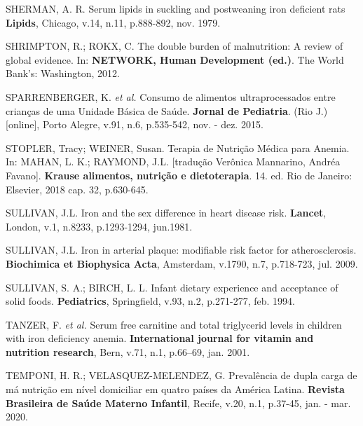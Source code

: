 \noindent SHERMAN, A. R. Serum lipids in suckling and postweaning iron deficient rats \textbf{Lipids}, Chicago, v.14, n.11, p.888-892, nov. 1979.

\bigbreak

\noindent SHRIMPTON, R.; ROKX, C. The double burden of malnutrition: A review of global evidence. In: \textbf{NETWORK, Human Development (ed.)}. The World Bank’s: Washington, 2012.

\bigbreak

\noindent SPARRENBERGER, K. \textit{et al.} Consumo de alimentos ultraprocessados entre crianças de uma Unidade Básica de Saúde. \textbf{Jornal de Pediatria}. (Rio J.) [online], Porto Alegre, v.91, n.6, p.535-542, nov. - dez. 2015.

\bigbreak

\noindent STOPLER, Tracy; WEINER, Susan. Terapia de Nutrição Médica para Anemia. In: MAHAN, L. K.; RAYMOND, J.L. [tradução Verônica Mannarino, Andréa Favano]. \textbf{Krause alimentos, nutrição e dietoterapia}. 14. ed. Rio de Janeiro: Elsevier, 2018 cap. 32, p.630-645.

\bigbreak

\noindent SULLIVAN, J.L. Iron and the sex difference in heart disease risk. \textbf{Lancet}, London, v.1, n.8233, p.1293-1294, jun.1981.

\bigbreak

\noindent SULLIVAN, J.L. Iron in arterial plaque: modifiable risk factor for atherosclerosis. \textbf{Biochimica et Biophysica Acta}, Amsterdam, v.1790, n.7, p.718-723, jul. 2009.

\bigbreak

\noindent SULLIVAN, S. A.; BIRCH, L. L. Infant dietary experience and acceptance of solid foods. \textbf{Pediatrics}, Springfield, v.93, n.2, p.271-277, feb. 1994. 

\bigbreak

\noindent TANZER, F. \textit{et al.} Serum free carnitine and total triglycerid levels in children with iron deficiency anemia. \textbf{International journal for vitamin and nutrition research}, Bern, v.71, n.1, p.66–69, jan. 2001.

\bigbreak

\noindent TEMPONI, H. R.; VELASQUEZ-MELENDEZ, G. Prevalência de dupla carga de má nutrição em nível domiciliar em quatro países da América Latina. \textbf{Revista Brasileira de Saúde Materno Infantil}, Recife, v.20, n.1, p.37-45, jan. - mar. 2020.

\bigbreak

